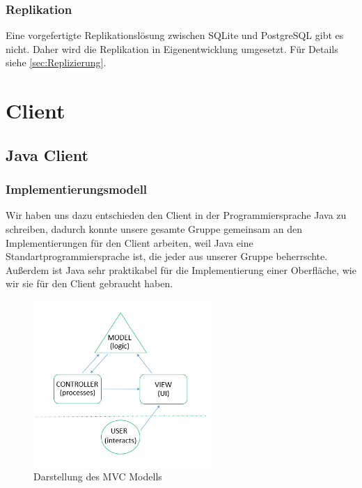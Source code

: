 \documentclass[12pt,a4paper,ngerman,english]{report}
\begin{document}
\subsubsection{Replikation}

Eine vorgefertigte Replikationslösung zwischen SQLite und PostgreSQL gibt es nicht. Daher wird die Replikation in Eigenentwicklung umgesetzt. Für Details siehe \autoref{sec:Replizierung}.

\section{Client}
\subsection{Java Client}
\subsubsection{Implementierungsmodell}
Wir haben uns dazu entschieden den Client in der Programmiersprache Java zu schreiben, dadurch konnte unsere gesamte Gruppe gemeinsam an den Implementierungen für den Client arbeiten, weil Java eine Standartprogrammiersprache ist, die jeder aus unserer Gruppe beherrschte. Außerdem ist Java sehr praktikabel für die Implementierung einer Oberfläche, wie wir sie für den Client gebraucht haben.\\

\begin{figure}[h]
  \centering
  \includegraphics[width=0.6\textwidth]{img/mvc.png}
  \caption{Darstellung des MVC Modells}
  \label{fig:MVC}
\end{figure}
\end{document}
